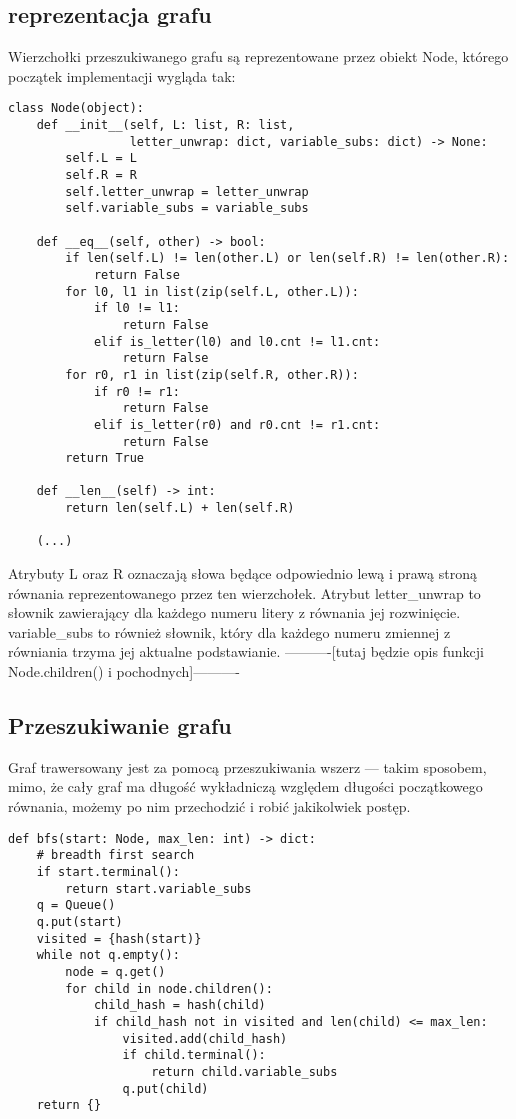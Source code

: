\documentclass[leqno, 12pt]{article}
\begin{document}
\subsection{reprezentacja grafu}
Wierzchołki przeszukiwanego grafu są reprezentowane przez obiekt Node, którego początek implementacji wygląda tak:
\begin{verbatim}
class Node(object):
    def __init__(self, L: list, R: list, 
                 letter_unwrap: dict, variable_subs: dict) -> None:
        self.L = L
        self.R = R
        self.letter_unwrap = letter_unwrap
        self.variable_subs = variable_subs

    def __eq__(self, other) -> bool:
        if len(self.L) != len(other.L) or len(self.R) != len(other.R):
            return False
        for l0, l1 in list(zip(self.L, other.L)):
            if l0 != l1:
                return False
            elif is_letter(l0) and l0.cnt != l1.cnt:
                return False
        for r0, r1 in list(zip(self.R, other.R)):
            if r0 != r1:
                return False
            elif is_letter(r0) and r0.cnt != r1.cnt:
                return False
        return True

    def __len__(self) -> int:
        return len(self.L) + len(self.R)

    (...)
\end{verbatim}
Atrybuty L oraz R oznaczają słowa będące odpowiednio lewą i prawą stroną równania reprezentowanego przez ten wierzchołek. Atrybut letter\_unwrap to słownik zawierający dla każdego numeru litery z równania jej rozwinięcie. variable\_subs to również słownik, który dla każdego numeru zmiennej z równiania trzyma jej aktualne podstawianie.
\newline\newline
----------[tutaj będzie opis funkcji Node.children() i pochodnych]----------

\subsection{Przeszukiwanie grafu}
Graf trawersowany jest za pomocą przeszukiwania wszerz --- takim sposobem, mimo, że cały graf ma długość wykładniczą względem długości początkowego równania, możemy po nim przechodzić i robić jakikolwiek postęp.

\begin{verbatim}
def bfs(start: Node, max_len: int) -> dict:
    # breadth first search
    if start.terminal():
        return start.variable_subs
    q = Queue()
    q.put(start)
    visited = {hash(start)}
    while not q.empty():
        node = q.get()
        for child in node.children():
            child_hash = hash(child)
            if child_hash not in visited and len(child) <= max_len:
                visited.add(child_hash)
                if child.terminal():
                    return child.variable_subs
                q.put(child)
    return {}
\end{verbatim}
\end{document}

